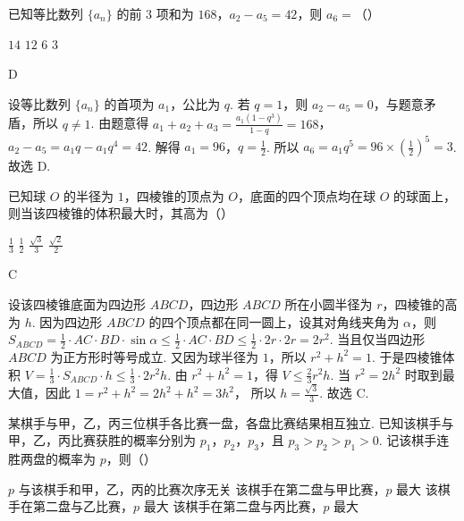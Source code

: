 \begin{problem}
已知等比数列 \(\{a_n\}\) 的前 \(3\) 项和为 \(168\)，\(a_2-a_5=42\)，则 \(a_6=\)（\quad）

\choices
    {\(14\)}
    {\(12\)}
    {\(6\)}
    {\(3\)}
\end{problem}

\begin{answer}
D
\end{answer}

\begin{solution}
设等比数列 \(\{a_n\}\) 的首项为 \(a_1\)，公比为 \(q\).
若 \(q=1\)，则 \(a_2-a_5=0\)，与题意矛盾，所以 \(q\neq 1\).
由题意得
\(a_1+a_2+a_3=\frac{a_1\left( 1-q^3 \right)}{1-q}=168\)，
\(a_2-a_5=a_1q-a_1q^4=42\).
解得
\(a_1=96\)，\(q=\frac{1}{2}\).
所以
\(a_6=a_1q^5=96\times \left( \frac{1}{2} \right)^5=3\).
故选 D.
\end{solution}

\begin{problem}
已知球 \(O\) 的半径为 \(1\)，四棱锥的顶点为 \(O\)，底面的四个顶点均在球 \(O\) 的球面上，则当该四棱锥的体积最大时，其高为（\quad）

\choices
    {\(\frac{1}{3}\)}
    {\(\frac{1}{2}\)}
    {\(\frac{\sqrt{3}}{3}\)}
    {\(\frac{\sqrt{2}}{2}\)}
\end{problem}

\begin{answer}
C
\end{answer}

\begin{solution}
设该四棱锥底面为四边形 \(ABCD\)，四边形 \(ABCD\) 所在小圆半径为 \(r\)，四棱锥的高为 \(h\).
因为四边形 \(ABCD\) 的四个顶点都在同一圆上，设其对角线夹角为 \(\alpha\)，则 \(S_{ABCD}=\frac{1}{2}\cdot AC\cdot BD\cdot \sin \alpha\le \frac{1}{2}\cdot AC\cdot BD\le \frac{1}{2}\cdot 2r\cdot 2r=2r^2\).
当且仅当四边形 \(ABCD\) 为正方形时等号成立.
又因为球半径为 \(1\)，所以
\(r^2+h^2=1\).
于是四棱锥体积
\(V=\frac{1}{3}\cdot S_{ABCD}\cdot h \le \frac{1}{3}\cdot 2r^2h\).
由 \(r^2+h^2=1\)，得
\(V\le \frac{2}{3}r^2h\).
当 \(r^2=2h^2\) 时取到最大值，因此
\(1=r^2+h^2=2h^2+h^2=3h^2\)，
所以
\(h=\frac{\sqrt{3}}{3}\).
故选 C.
\end{solution}

\begin{problem}
某棋手与甲，乙，丙三位棋手各比赛一盘，各盘比赛结果相互独立. 已知该棋手与甲，乙，丙比赛获胜的概率分别为 \(p_1\)，\(p_2\)，\(p_3\)，且 \(p_3>p_2>p_1>0\). 记该棋手连胜两盘的概率为 \(p\)，则（\quad）

\choices
    {\(p\) 与该棋手和甲，乙，丙的比赛次序无关}
    {该棋手在第二盘与甲比赛，\(p\) 最大}
    {该棋手在第二盘与乙比赛，\(p\) 最大}
    {该棋手在第二盘与丙比赛，\(p\) 最大}
\end{problem}

